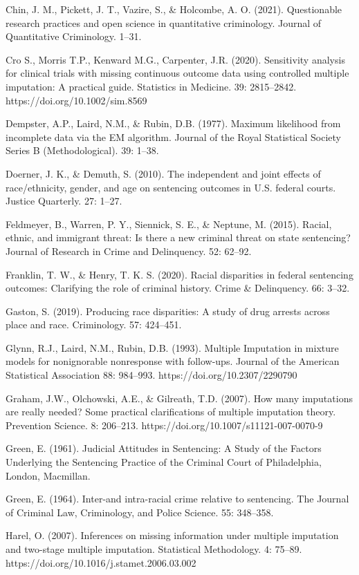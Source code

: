 \documentclass[titlepage]{article}
\begin{document}
Chin, J. M., Pickett, J. T., Vazire, S., \& Holcombe, A. O. (2021). Questionable research practices and open science in quantitative criminology. Journal of Quantitative Criminology. 1--31.

Cro S., Morris T.P., Kenward M.G., Carpenter, J.R. (2020). Sensitivity analysis for clinical trials with missing continuous outcome data using controlled multiple imputation: A practical guide. Statistics in Medicine. 39: 2815–2842. https://doi.org/10.1002/sim.8569 

Dempster, A.P., Laird, N.M., \& Rubin, D.B. (1977). Maximum likelihood from incomplete data via the EM algorithm. Journal of the Royal Statistical Society Series B (Methodological). 39: 1--38.

Doerner, J. K., \& Demuth, S. (2010). The independent and joint effects of race/ethnicity, gender, and age on sentencing outcomes in U.S. federal courts. Justice Quarterly. 27: 1--27.

Feldmeyer, B., Warren, P. Y., Siennick, S. E., \& Neptune, M. (2015). Racial, ethnic, and immigrant threat: Is there a new criminal threat on state sentencing? Journal of Research in Crime and Delinquency. 52: 62--92.

Franklin, T. W., \& Henry, T. K. S. (2020). Racial disparities in federal sentencing outcomes: Clarifying the role of criminal history. Crime \& Delinquency. 66: 3--32.

Gaston, S. (2019). Producing race disparities: A study of drug arrests across place and race. Criminology. 57: 424--451.

Glynn, R.J., Laird, N.M., Rubin, D.B. (1993). Multiple Imputation in mixture models for nonignorable nonresponse with follow-ups. Journal of the American Statistical Association 88: 984–993. https://doi.org/10.2307/2290790 

Graham, J.W., Olchowski, A.E., \& Gilreath, T.D. (2007). How many imputations are really needed? Some practical clarifications of multiple imputation theory. Prevention Science. 8: 206--213. https://doi.org/10.1007/s11121-007-0070-9

Green, E. (1961). Judicial Attitudes in Sentencing: A Study of the Factors Underlying the Sentencing Practice of the Criminal Court of Philadelphia, London, Macmillan.

Green, E. (1964). Inter-and intra-racial crime relative to sentencing. The Journal of Criminal Law, Criminology, and Police Science. 55: 348--358.

Harel, O. (2007). Inferences on missing information under multiple imputation and two-stage multiple imputation. Statistical Methodology. 4: 75--89. https://doi.org/10.1016/j.stamet.2006.03.002
\end{document}
